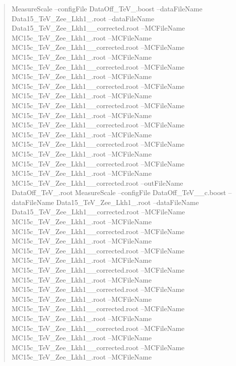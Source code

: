 \begin{quote}
Measure\+Scale --config\+File Data\+Off\+\_\+Te\+V\+\_.\+boost --data\+File\+Name Data15\+\_\+Te\+V\+\_\+\+Zee\+\_\+\+Lkh1\+\_.\+root --data\+File\+Name Data15\+\_\+Te\+V\+\_\+\+Zee\+\_\+\+Lkh1\+\_\+\_\+corrected.\+root --M\+C\+File\+Name M\+C15c\+\_\+Te\+V\+\_\+\+Zee\+\_\+\+Lkh1\+\_.\+root --M\+C\+File\+Name M\+C15c\+\_\+Te\+V\+\_\+\+Zee\+\_\+\+Lkh1\+\_\+\_\+corrected.\+root --M\+C\+File\+Name M\+C15c\+\_\+Te\+V\+\_\+\+Zee\+\_\+\+Lkh1\+\_.\+root --M\+C\+File\+Name M\+C15c\+\_\+Te\+V\+\_\+\+Zee\+\_\+\+Lkh1\+\_\+\_\+corrected.\+root --M\+C\+File\+Name M\+C15c\+\_\+Te\+V\+\_\+\+Zee\+\_\+\+Lkh1\+\_.\+root --M\+C\+File\+Name M\+C15c\+\_\+Te\+V\+\_\+\+Zee\+\_\+\+Lkh1\+\_\+\_\+corrected.\+root --M\+C\+File\+Name M\+C15c\+\_\+Te\+V\+\_\+\+Zee\+\_\+\+Lkh1\+\_.\+root --M\+C\+File\+Name M\+C15c\+\_\+Te\+V\+\_\+\+Zee\+\_\+\+Lkh1\+\_\+\_\+corrected.\+root --M\+C\+File\+Name M\+C15c\+\_\+Te\+V\+\_\+\+Zee\+\_\+\+Lkh1\+\_.\+root --M\+C\+File\+Name M\+C15c\+\_\+Te\+V\+\_\+\+Zee\+\_\+\+Lkh1\+\_\+\_\+corrected.\+root --M\+C\+File\+Name M\+C15c\+\_\+Te\+V\+\_\+\+Zee\+\_\+\+Lkh1\+\_.\+root --M\+C\+File\+Name M\+C15c\+\_\+Te\+V\+\_\+\+Zee\+\_\+\+Lkh1\+\_\+\_\+corrected.\+root --M\+C\+File\+Name M\+C15c\+\_\+Te\+V\+\_\+\+Zee\+\_\+\+Lkh1\+\_.\+root --M\+C\+File\+Name M\+C15c\+\_\+Te\+V\+\_\+\+Zee\+\_\+\+Lkh1\+\_\+\_\+corrected.\+root --M\+C\+File\+Name M\+C15c\+\_\+Te\+V\+\_\+\+Zee\+\_\+\+Lkh1\+\_.\+root --M\+C\+File\+Name M\+C15c\+\_\+Te\+V\+\_\+\+Zee\+\_\+\+Lkh1\+\_\+\_\+corrected.\+root --out\+File\+Name Data\+Off\+\_\+Te\+V\+\_.\+root Measure\+Scale --config\+File Data\+Off\+\_\+Te\+V\+\_\+\_\+c.\+boost --data\+File\+Name Data15\+\_\+Te\+V\+\_\+\+Zee\+\_\+\+Lkh1\+\_.\+root --data\+File\+Name Data15\+\_\+Te\+V\+\_\+\+Zee\+\_\+\+Lkh1\+\_\+\_\+corrected.\+root --M\+C\+File\+Name M\+C15c\+\_\+Te\+V\+\_\+\+Zee\+\_\+\+Lkh1\+\_.\+root --M\+C\+File\+Name M\+C15c\+\_\+Te\+V\+\_\+\+Zee\+\_\+\+Lkh1\+\_\+\_\+corrected.\+root --M\+C\+File\+Name M\+C15c\+\_\+Te\+V\+\_\+\+Zee\+\_\+\+Lkh1\+\_.\+root --M\+C\+File\+Name M\+C15c\+\_\+Te\+V\+\_\+\+Zee\+\_\+\+Lkh1\+\_\+\_\+corrected.\+root --M\+C\+File\+Name M\+C15c\+\_\+Te\+V\+\_\+\+Zee\+\_\+\+Lkh1\+\_.\+root --M\+C\+File\+Name M\+C15c\+\_\+Te\+V\+\_\+\+Zee\+\_\+\+Lkh1\+\_\+\_\+corrected.\+root --M\+C\+File\+Name M\+C15c\+\_\+Te\+V\+\_\+\+Zee\+\_\+\+Lkh1\+\_.\+root --M\+C\+File\+Name M\+C15c\+\_\+Te\+V\+\_\+\+Zee\+\_\+\+Lkh1\+\_\+\_\+corrected.\+root --M\+C\+File\+Name M\+C15c\+\_\+Te\+V\+\_\+\+Zee\+\_\+\+Lkh1\+\_.\+root --M\+C\+File\+Name M\+C15c\+\_\+Te\+V\+\_\+\+Zee\+\_\+\+Lkh1\+\_\+\_\+corrected.\+root --M\+C\+File\+Name M\+C15c\+\_\+Te\+V\+\_\+\+Zee\+\_\+\+Lkh1\+\_.\+root --M\+C\+File\+Name M\+C15c\+\_\+Te\+V\+\_\+\+Zee\+\_\+\+Lkh1\+\_\+\_\+corrected.\+root --M\+C\+File\+Name M\+C15c\+\_\+Te\+V\+\_\+\+Zee\+\_\+\+Lkh1\+\_.\+root --M\+C\+File\+Name M\+C15c\+\_\+Te\+V\+\_\+\+Zee\+\_\+\+Lkh1\+\_\+\_\+corrected.\+root --M\+C\+File\+Name M\+C15c\+\_\+Te\+V\+\_\+\+Zee\+\_\+\+Lkh1\+\_.\+root --M\+C\+File\+Name 
\end{quote}
